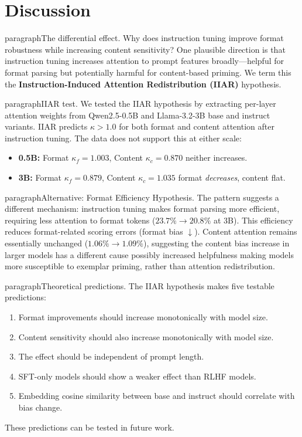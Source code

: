 \documentclass[11pt,twocolumn]{article}
\begin{document}
\section{Discussion}

paragraph{The differential effect.}
Why does instruction tuning improve format robustness while increasing content sensitivity? One plausible direction is that instruction tuning increases attention to prompt features broadly---helpful for format parsing but potentially harmful for content-based priming. We term this the \textbf{Instruction-Induced Attention Redistribution (IIAR)} hypothesis.

paragraph{IIAR test.} We tested the IIAR hypothesis by extracting per-layer attention weights from Qwen2.5-0.5B and Llama-3.2-3B base and instruct variants. IIAR predicts $\kappa > 1.0$ for both format and content attention after instruction tuning. The data does not support this at either scale:

\begin{itemize}
    \item \textbf{0.5B:} Format $\kappa_f = 1.003$, Content $\kappa_c = 0.870$  neither increases.
    \item \textbf{3B:} Format $\kappa_f = 0.879$, Content $\kappa_c = 1.035$  format \emph{decreases}, content flat.
\end{itemize}

paragraph{Alternative: Format Efficiency Hypothesis.} The pattern suggests a different mechanism: instruction tuning makes format parsing more efficient, requiring less attention to format tokens ($23.7\% \to 20.8\%$ at 3B). This efficiency reduces format-related scoring errors (format bias $\downarrow$). Content attention remains essentially unchanged ($1.06\% \to 1.09\%$), suggesting the content bias increase in larger models has a different cause  possibly increased helpfulness making models more susceptible to exemplar priming, rather than attention redistribution.

paragraph{Theoretical predictions.}
The IIAR hypothesis makes five testable predictions:
\begin{enumerate}
    \item Format improvements should increase monotonically with model size.
    \item Content sensitivity should also increase monotonically with model size.
    \item The effect should be independent of prompt length.
    \item SFT-only models should show a weaker effect than RLHF models.
    \item Embedding cosine similarity between base and instruct should correlate with bias change.
\end{enumerate}
These predictions can be tested in future work.
\end{document}
